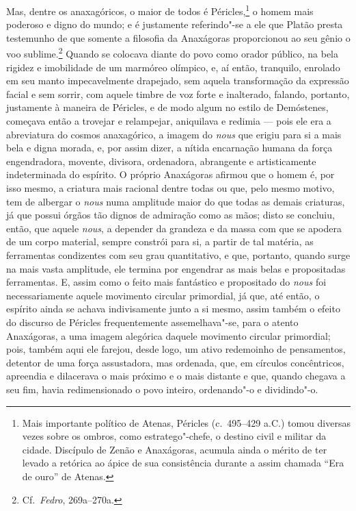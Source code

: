 Mas, dentre os anaxagóricos, o maior de todos é Péricles,\footnote{ Mais
importante político de Atenas, Péricles (c.~495--429 a.C.) tomou diversas
vezes sobre os ombros, como estratego"-chefe, o destino civil e militar da
cidade. Discípulo de Zenão e Anaxágoras, acumula ainda o mérito de ter levado
a retórica ao ápice de sua consistência durante a assim chamada ``Era de
ouro'' de Atenas.} o homem mais poderoso e digno do mundo; e é justamente
referindo"-se a ele que Platão presta testemunho de que somente a filosofia
da Anaxágoras proporcionou ao seu gênio o voo sublime.\footnote{ Cf.~\textit{Fedro}, 
269a--270a.} Quando se colocava diante do povo como orador público,
na bela rigidez e imobilidade de um marmóreo olímpico, e, aí então,
tranquilo, enrolado em seu manto impecavelmente drapejado, sem aquela
transformação da expressão facial e sem sorrir, com aquele timbre de voz
forte e inalterado, falando, portanto, justamente à maneira de Péricles, e de
modo algum no estilo de Demóstenes, começava então a trovejar e relampejar,
aniquilava e redimia --- pois ele era a abreviatura do cosmos anaxagórico, a
imagem do \textit{nous} que erigiu para si a mais bela e digna morada, e, por
assim dizer, a nítida encarnação humana da força engendradora, movente,
divisora, ordenadora, abrangente e artisticamente indeterminada do espírito.
O próprio Anaxágoras afirmou que o homem é, por isso mesmo, a criatura mais
racional dentre todas ou que, pelo mesmo motivo, tem de albergar o
\textit{nous} numa amplitude maior do que todas as demais criaturas, já que
 possui órgãos tão dignos de admiração como as mãos; disto se concluiu,
 então, que aquele \textit{nous}, a depender da grandeza e da massa com que
 se apodera de um corpo material, sempre constrói para si, a partir de tal
 matéria, as ferramentas condizentes com seu grau quantitativo, e que,
 portanto, quando surge na mais vasta amplitude, ele termina por engendrar as
 mais belas e propositadas ferramentas. E, assim como o feito mais fantástico
 e propositado do \textit{nous} foi necessariamente aquele movimento circular
 primordial, já que, até então, o espírito ainda se achava indivisamente
 junto a si mesmo, assim também o efeito do discurso de Péricles
 frequentemente assemelhava"-se, para o atento Anaxágoras, a uma imagem
 alegórica daquele movimento circular primordial; pois, também aqui ele
 farejou, desde logo, um ativo redemoinho de pensamentos, detentor de uma
 força assustadora, mas ordenada, que, em círculos concêntricos, apreendia e
 dilacerava o mais próximo e o mais distante e que, quando chegava a seu fim,
 havia redimensionado o povo inteiro, ordenando"-o e dividindo"-o.

